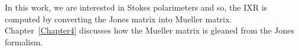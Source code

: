\noindent In this work, we are interested in Stokes polarimeters and so, the IXR is computed by converting the Jones matrix into Mueller matrix. Chapter~\ref{Chapter4}
discusses how the Mueller matrix is gleaned from the Jones formalism. 
% 
%    
%
